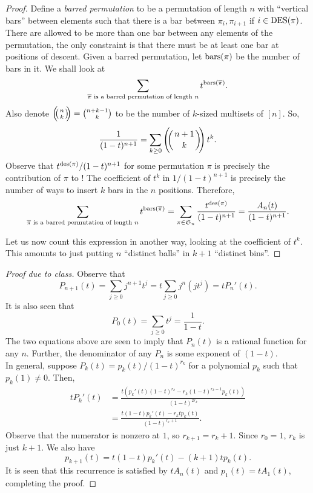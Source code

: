 	\begin{proof}
		Define a \emph{barred permutation} to be a permutation of length $n$ with ``vertical bars'' between elements such that there is a bar between $\pi_i,\pi_{i+1}$ if $i \in \operatorname{DES}(\pi)$. There are allowed to be more than one bar between any elements of the permutation, the only constraint is that there must be at least one bar at positions of descent. Given a barred permutation, let $\operatorname{bars}(\pi)$ be the number of bars in it. We shall look at
		\begin{equation}
			\label{eqn: counting to carlitz identity}
			\sum_{\overline{\pi} \text{ is a barred permutation of length $n$}} t^{\operatorname{bars}(\overline{\pi})}.
		\end{equation}
		Also denote $\mbinom{n}{k} = \binom{n+k-1}{k}$ to be the number of $k$-sized multisets of $[n]$. So,
		\[ \frac{1}{(1-t)^{n+1}} = \sum_{k \ge 0} \mbinom{n+1}{k} t^k. \]
		Observe that $t^{\operatorname{des}(\pi)}/(1-t)^{n+1}$ for some permutation $\pi$ is precisely the contribution of $\pi$ to ! The coefficient of $t^k$ in $1/(1-t)^{n+1}$ is precisely the number of ways to insert $k$ bars in the $n$ positions. Therefore,
		\[ \sum_{\overline{\pi} \text{ is a barred permutation of length $n$}} t^{\operatorname{bars}(\overline{\pi})} = \sum_{\pi \in \mathfrak{S}_n} \frac{t^{\operatorname{des}(\pi)}}{(1-t)^{n+1}} = \frac{A_n(t)}{(1-t)^{n+1}}. \]

		Let us now count this expression in another way, looking at the coefficient of $t^k$. This amounts to just putting $n$ ``distinct balls'' in $k+1$ ``distinct bins''. 
	\end{proof}

	\begin{proof}[Proof due to class]
		Observe that
		\[ P_{n+1}(t) = \sum_{j \ge 0} j^{n+1} t^j = t \sum_{j \ge 0} j^n (jt^j) = t P_n'(t). \]
		It is also seen that
		\[ P_0(t) = \sum_{j \ge 0} t^j = \frac{1}{1-t}. \]
		The two equations above are seen to imply that $P_n(t)$ is a rational function for any $n$. Further, the denominator of any $P_n$ is some exponent of $(1-t)$. \\
		In general, suppose $P_k(t) = p_k(t)/(1-t)^{r_k}$ for a polynomial $p_k$ such that $p_k(1) \ne 0$. Then,
		\begin{align*}
			tP_k'(t) &= \frac{t \left( p_k'(t) (1-t)^{r_k} - r_k (1-t)^{r_k - 1} p_k(t) \right)}{(1-t)^{2r_k}} \\
				&= \frac{ t(1-t)p_k'(t) - r_k t p_k(t) }{(1-t)^{r_k+1}}.
		\end{align*}
		Observe that the numerator is nonzero at $1$, so $r_{k+1} = r_k + 1$. Since $r_0 = 1$, $r_k$ is just $k+1$. We also have
		\[ p_{k+1}(t) = t (1-t) p_k'(t) - (k+1) t p_k(t). \]
		It is seen that this recurrence is satisfied by $tA_n(t)$ and $p_1(t) = tA_1(t)$, completing the proof.
	\end{proof}